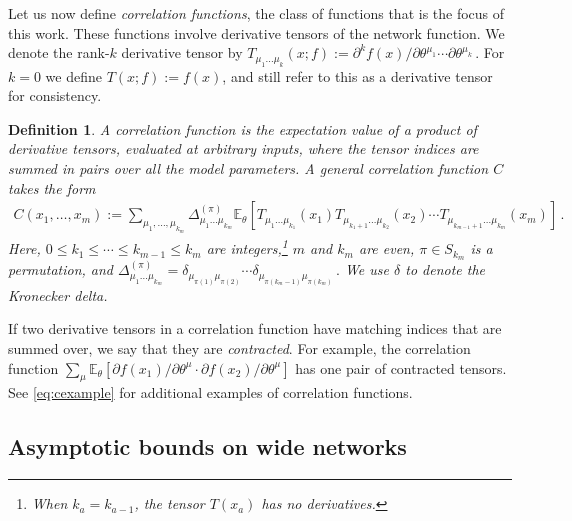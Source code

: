 \documentclass[english]{article}
\newtheorem{definition}{Definition}
\newcommand{\dho}{\partial}
\newcommand{\lexpp}[1]{\mathbb{E}_{#1}\left[}
\newcommand{\rexp}{\right]}
\begin{document}
Let us now define \emph{correlation functions}, the class of functions that is the focus of this work.
These functions involve derivative tensors of the network function.
We denote the rank-$k$ derivative tensor by
$
  T_{\mu_1 \dots \mu_k}(x;f) := \dho^k f(x) / \dho \theta^{\mu_1} \cdots \dho \theta^{\mu_k} \,.
$
For $k=0$ we define $T(x;f):=f(x)$, and still refer to this as a derivative tensor for consistency.

\begin{definition} \label{def:corr}
  A \emph{correlation function} is the expectation value of a product of derivative tensors, evaluated at arbitrary inputs, where the tensor indices are summed in pairs over all the model parameters.
  A general correlation function $C$ takes the form
  \begin{align}
    C(x_1,\dots,x_m) :=
    \!\! \sum_{\mu_1,\dots,\mu_{k_m}} \!\!
    \Delta_{\mu_1 \dots \mu_{k_m}}^{(\pi)}
    \lexpp{\theta}
    T_{\mu_1 \dots \mu_{k_1}} (x_1)
    T_{\mu_{k_1+1} \dots \mu_{k_2}} (x_2)
    \cdots
    T_{\mu_{k_{m-1}+1} \dots \mu_{k_m}} (x_m)
    \rexp \,. \label{eq:corr}
  \end{align}
  Here, $0 \le k_1 \le \cdots \le k_{m-1} \le k_m$ are integers,\footnote{When $k_a=k_{a-1}$, the tensor $T(x_{a})$ has no derivatives.} $m$ and $k_m$ are even, $\pi \in S_{k_m}$ is a permutation, and
  $
    \Delta_{\mu_1 \dots \mu_{k_m}}^{(\pi)} =
    \delta_{\mu_{\pi(1)} \mu_{\pi(2)}} \cdots \delta_{\mu_{\pi(k_m-1)} \mu_{\pi(k_m)}} \,.
  $
  We use $\delta$ to denote the Kronecker delta.
\end{definition}
If two derivative tensors in a correlation function have matching indices that are summed over, we say that they are \emph{contracted}.
For example, the correlation function $\sum_\mu \lexpp{\theta} \dho f(x_1) / \dho \theta^\mu \cdot \dho f(x_2) / \dho \theta^\mu  \rexp$ has one pair of contracted tensors.
See \eqref{eq:cexample} for additional examples of correlation functions.

\subsection{Asymptotic bounds on wide networks}
\end{document}
